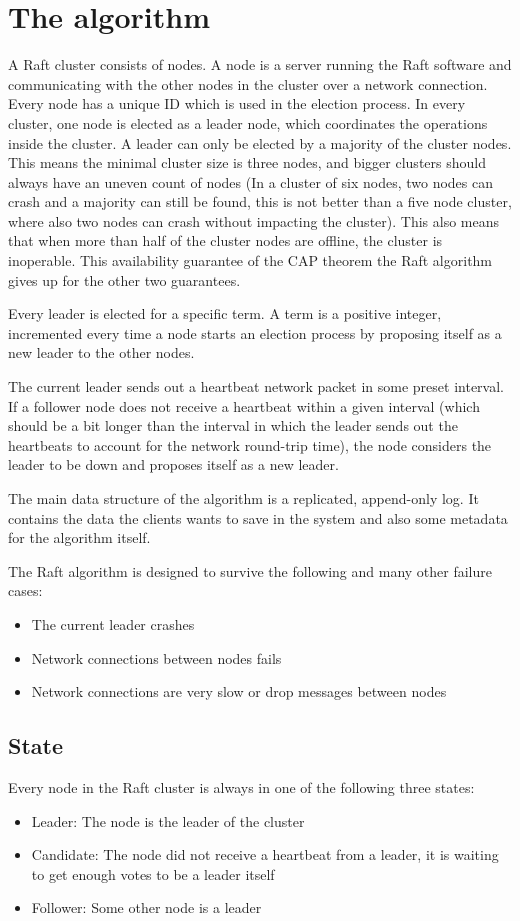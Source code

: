 \section{The algorithm}
A Raft cluster consists of nodes. A node is a server running the Raft software and communicating with the other nodes in the cluster over a network connection.
Every node has a unique ID which is used in the election process. In every cluster, one node is elected as a leader node, which coordinates the operations inside the cluster. A leader can only be elected by
a majority of the cluster nodes. This means the minimal cluster size is three nodes, and bigger clusters should always have an uneven count of nodes (In a cluster
of six nodes, two nodes can crash and a majority can still be found, this is not better than a five node cluster, where also two nodes can crash without impacting the cluster).
This also means that when more than half of the cluster nodes are offline, the cluster is inoperable.
This availability guarantee of the CAP theorem the Raft algorithm gives up for the other two guarantees.

Every leader is elected for a specific term. A term is a positive integer, incremented every time a node starts an election process by proposing itself as a new leader to the other nodes.

The current leader sends out a heartbeat network packet in some preset interval. If a follower node does not receive a heartbeat within a given interval (which should be a bit longer than the interval in which the leader sends out the heartbeats to account for the network round-trip time), the node considers the leader to be down and proposes itself as a new leader.

The main data structure of the algorithm is a replicated, append-only log. It contains the data the clients wants to save in the system and also some metadata
for the algorithm itself.

The Raft algorithm is designed to survive the following and many other failure cases:
\begin{itemize}
    \item The current leader crashes
    \item Network connections between nodes fails
    \item Network connections are very slow or drop messages between nodes
\end{itemize}

\subsection{State}
Every node in the Raft cluster is always in one of the following three states:
\begin{itemize}
    \item Leader: The node is the leader of the cluster
    \item Candidate: The node did not receive a heartbeat from a leader, it is waiting to get enough votes to be a leader itself
    \item Follower: Some other node is a leader
\end{itemize}



